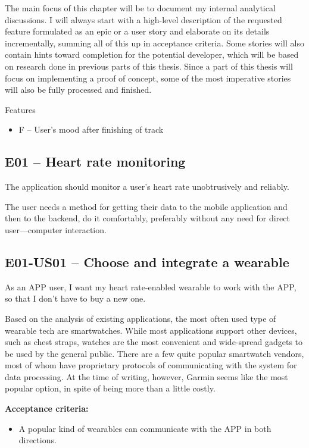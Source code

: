 The main focus of this chapter will be to document my internal analytical discussions.
I will always start with a high-level description of the requested feature formulated as an epic or a user story and elaborate on its details incrementally, summing all of this up in acceptance criteria.
Some stories will also contain hints toward completion for the potential developer, which will be based on research done in previous parts of this thesis.
Since a part of this thesis will focus on implementing a proof of concept, some of the most imperative stories will also be fully processed and finished.

Features
\begin{itemize}
    \item F -- User's mood after finishing of track
\end{itemize}
\subsection*{E01 -- Heart rate monitoring}
The application should monitor a user's heart rate unobtrusively and reliably.

The user needs a method for getting their data to the mobile application and then to the backend, do it comfortably, preferably without any need for direct user---computer interaction.

\subsection*{E01-US01 -- Choose and integrate a wearable}
As an APP user, I want my heart rate-enabled wearable to work with the APP, so that I don't have to buy a new one.

Based on the analysis of existing applications, the most often used type of wearable tech are smartwatches.
While most applications support other devices, such as chest straps, watches are the most convenient and wide-spread gadgets to be used by the general public.
There are a few quite popular smartwatch vendors, most of whom have proprietary protocols of communicating with the system for data processing.
At the time of writing, however, Garmin seems like the most popular option, in spite of being more than a little costly.

\textbf{Acceptance criteria:}
\begin{itemize}
    \item A popular kind of wearables can communicate with the APP in both directions.
\end{itemize}

